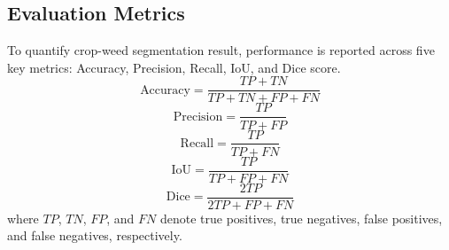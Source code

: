 \documentclass[pdflatex,sn-mathphys-num]{sn-jnl}
\begin{document}
\subsection{Evaluation Metrics}
\label{evaluation_metrics}

To quantify crop-weed segmentation result, performance is reported across five key metrics: Accuracy, Precision, Recall, IoU, and Dice score.
\begin{equation}
\text{Accuracy} = \frac{TP + TN}{TP + TN + FP + FN}
\end{equation}
\begin{equation}
\text{Precision} = \frac{TP}{TP + FP}
\end{equation}
\begin{equation}
\text{Recall} = \frac{TP}{TP + FN}
\end{equation}
\begin{equation}
\text{IoU} = \frac{TP}{TP + FP + FN}
\end{equation}
\begin{equation}
\text{Dice} = \frac{2TP}{2TP + FP + FN}
\end{equation}
where $TP$, $TN$, $FP$, and $FN$ denote true positives, true negatives, false positives, and false negatives, respectively.






\end{document}
